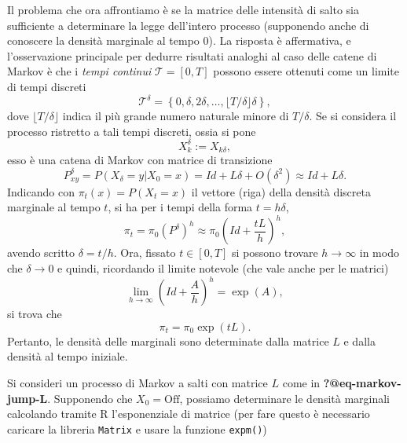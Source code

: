 \documentclass[
  italian,
  letterpaper,
]{book}
\newcommand{\bra}[1]{\left( #1 \right)}
\newcommand{\cur}[1]{\left\{ #1 \right\}}
\theoremstyle{definition}
\theoremstyle{remark}
\begin{document}
Il problema che ora affrontiamo è se la matrice delle intensità di salto
sia sufficiente a determinare la legge dell'intero processo (supponendo
anche di conoscere la densità marginale al tempo \(0\)). La risposta è
affermativa, e l'osservazione principale per dedurre risultati analoghi
al caso delle catene di Markov è che i \emph{tempi continui}
\(\mathcal{T} = [0,T]\) possono essere ottenuti come un limite di tempi
discreti
\[ \mathcal{T}^\delta = \cur{0, \delta, 2\delta, \ldots, \lfloor T/ \delta \rfloor \delta },\]
dove \(\lfloor T/\delta \rfloor\) indica il più grande numero naturale
minore di \(T/\delta\). Se si considera il processo ristretto a tali
tempi discreti, ossia si pone \[ X^\delta_k := X_{k \delta},\] esso è
una catena di Markov con matrice di transizione
\[ P^\delta_{xy} = P(X_{\delta} = y| X_0 = x) = Id + L \delta + O(\delta^2) \approx Id + L \delta.\]
Indicando con \(\pi_{t}(x) = P(X_t = x)\) il vettore (riga) della
densità discreta marginale al tempo \(t\), si ha per i tempi della forma
\(t = h \delta\),
\[ \pi_t = \pi_0 ( P^{\delta})^h \approx \pi_0 \bra{ Id + \frac{t L}{h}}^h,\]
avendo scritto \(\delta = t/h\). Ora, fissato \(t \in [0,T]\) si possono
trovare \(h \to \infty\) in modo che \(\delta \to 0\) e quindi,
ricordando il limite notevole (che vale anche per le matrici)
\[ \lim_{h \to \infty} \bra{Id + \frac{A}{h}}^h = \exp\bra{A}, \] si
trova che \[ \pi_t = \pi_0 \exp\bra{ t L}.\] Pertanto, le densità delle
marginali sono determinate dalla matrice \(L\) e dalla densità al tempo
iniziale.

Si consideri un processo di Markov a salti con matrice \(L\) come in
\textbf{?@eq-markov-jump-L}. Supponendo che \(X_0 = \text{Off}\),
possiamo determinare le densità marginali calcolando tramite R
l'esponenziale di matrice (per fare questo è necessario caricare la
libreria \texttt{Matrix} e usare la funzione \texttt{expm()})
\end{document}
